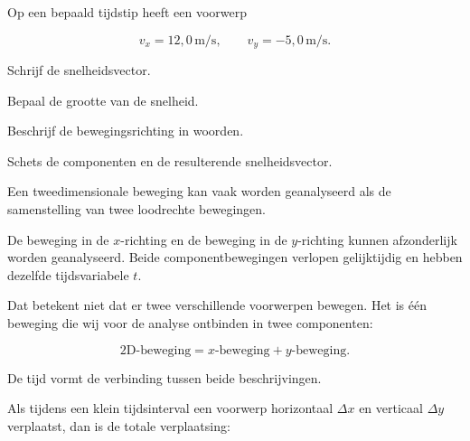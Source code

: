 \documentclass{ximera}
\begin{document}
\begin{oefening}{\oefB\ESS}

Op een bepaald tijdstip heeft een voorwerp

\[
v_x=12,0\,\mathrm{m/s},
\qquad
v_y=-5,0\,\mathrm{m/s}.
\]

\begin{question}
Schrijf de snelheidsvector.
\end{question}

\begin{question}
Bepaal de grootte van de snelheid.
\end{question}

\begin{question}
Beschrijf de bewegingsrichting in woorden.
\end{question}

\begin{question}
Schets de componenten en de resulterende snelheidsvector.
\end{question}

\end{oefening}




Een tweedimensionale beweging kan vaak worden geanalyseerd als de
samenstelling van twee loodrechte bewegingen.

\begin{eigenschap}[Onafhankelijkheidsbeginsel]

De beweging in de $x$-richting en de beweging in de $y$-richting
kunnen afzonderlijk worden geanalyseerd. Beide componentbewegingen
verlopen gelijktijdig en hebben dezelfde tijdsvariabele $t$.

\end{eigenschap}

Dat betekent niet dat er twee verschillende voorwerpen bewegen. Het
is één beweging die wij voor de analyse ontbinden in twee componenten:

\[
\boxed{
\text{2D-beweging}
=
\text{$x$-beweging}
+
\text{$y$-beweging}.
}
\]

De tijd vormt de verbinding tussen beide beschrijvingen.



Als tijdens een klein tijdsinterval een voorwerp horizontaal
$\Delta x$ en verticaal $\Delta y$ verplaatst, dan is de totale
verplaatsing:
\end{document}
